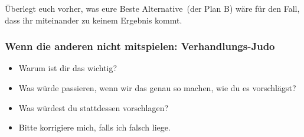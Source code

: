 Überlegt euch vorher, was eure \glqq Beste Alternative\grqq\ (der \glqq Plan B\grqq) wäre für den Fall, dass ihr miteinander zu keinem Ergebnis kommt.


\subsubsection{Wenn die anderen nicht mitspielen: Verhandlungs-Judo}

\begin{itemize}
  \item Warum ist dir das wichtig?
  \item Was würde passieren, wenn wir das genau so machen, wie du es vorschlägst?
  \item Was würdest du stattdessen vorschlagen?
  \item Bitte korrigiere mich, falls ich falsch liege.
\end{itemize}
